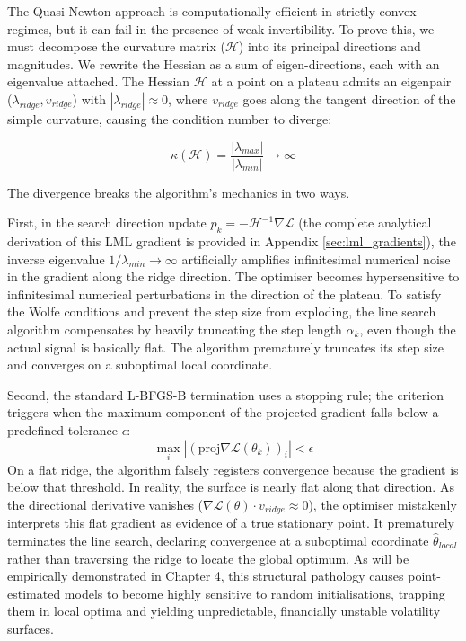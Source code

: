 \documentclass[12pt,oneside]{report}
\theoremstyle{definition}
\theoremstyle{remark}
\begin{document}
The Quasi-Newton approach is computationally efficient in strictly convex regimes, but it can fail in the presence of weak invertibility. To prove this, we must decompose the curvature matrix ($\mathcal{H}$) into its principal directions and magnitudes. We rewrite the Hessian as a sum of eigen-directions, each with an eigenvalue attached. The Hessian $\mathcal{H}$ at a point on a plateau admits an eigenpair ($\lambda_{ridge},v_{ridge}$) with $|\lambda_{ridge}| \approx 0$, where $v_{ridge}$ goes along the tangent direction of the simple curvature, causing the condition number to diverge:

$$\kappa(\mathcal{H}) = \frac{|\lambda_{max}|}{|\lambda_{min}|} \to \infty$$

The divergence breaks the algorithm's mechanics in two ways. 

First, in the search direction update $p_k = -\mathcal{H}^{-1} \nabla \mathcal{L}$ (the complete analytical derivation of this LML gradient is provided in Appendix \ref{sec:lml_gradients}), the inverse eigenvalue $1/\lambda_{min} \to \infty$ artificially amplifies infinitesimal numerical noise in the gradient along the ridge direction. The optimiser becomes hypersensitive to infinitesimal numerical perturbations in the direction of the plateau. To satisfy the Wolfe conditions and prevent the step size from exploding, the line search algorithm compensates by heavily truncating the step length $\alpha_k$, even though the actual signal is basically flat. The algorithm prematurely truncates its step size and converges on a suboptimal local coordinate.

Second, the standard L-BFGS-B termination uses a stopping rule; the criterion triggers when the maximum component of the projected gradient falls below a predefined tolerance $\epsilon$:$$\max_i |(\text{proj} \nabla \mathcal{L}(\theta_k))_i| < \epsilon$$ On a flat ridge, the algorithm falsely registers convergence because the gradient is below that threshold. In reality, the surface is nearly flat along that direction. As the directional derivative vanishes ($\nabla \mathcal{L}(\theta) \cdot v_{ridge} \approx 0$), the optimiser mistakenly interprets this flat gradient as evidence of a true stationary point. It prematurely terminates the line search, declaring convergence at a suboptimal coordinate $\hat{\theta}_{local}$ rather than traversing the ridge to locate the global optimum. As will be empirically demonstrated in Chapter 4, this structural pathology causes point-estimated models to become highly sensitive to random initialisations, trapping them in local optima and yielding unpredictable, financially unstable volatility surfaces.
\end{document}
